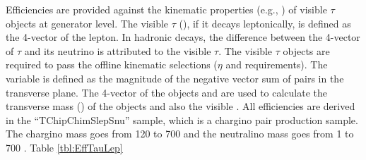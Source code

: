 Efficiencies are provided against the kinematic properties (e.g., \pt) of visible $\tau$ objects at generator level. The visible $\tau$ (\visTau), if it decays leptonically, is defined as the 4-vector of the lepton. In hadronic decays, the difference between the 4-vector of $\tau$ and its neutrino is attributed to the visible $\tau$. %
The visible $\tau$ objects are required to pass the offline kinematic selections ($\eta$ and \pt requirements). The \visMET variable is defined as the magnitude of the negative vector sum of \visTau pairs in the transverse plane. The 4-vector of the \visTau objects and \visMET are used to calculate the transverse mass (\mt) of the \visTau objects and also the visible \mttwo. All efficiencies are derived in the 
``TChipChimSlepSnu'' sample, which is a chargino pair production sample. The chargino mass goes from 120 to 700 \GeV and the neutralino mass goes from 
1 to 700 \GeV.
Table \ref{tbl:EffTauLep}
